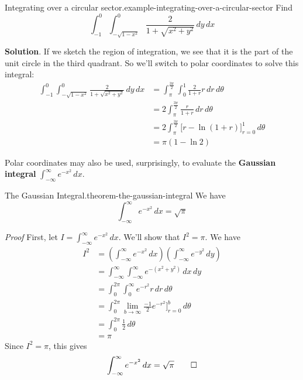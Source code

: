 \documentclass[10pt,]{book}
\makeatletter
\newcommand{\terminology}[1]{\textbf{#1}}
\renewcommand*{\proofname}{Proof}
\renewenvironment{proof}[1][\proofname]{\par
  \pushQED{\qed}%
  \normalfont \topsep6\p@\@plus6\p@\relax
  \trivlist
  \item\relax
    {\itshape
    #1\@addpunct{.}}\hspace\labelsep\ignorespaces
}{%
  \popQED\endtrivlist\@endpefalse
}
\numberwithin{equation}{section}
\makeatother
\begin{document}
\begin{example}{Integrating over a circular sector.}{example-integrating-over-a-circular-sector}%
\hypertarget{p-1488}{}%
Find%
\begin{equation*}
\int_{-1}^{0}\int_{-\sqrt{1-x^{2}}}^{0}\frac{2}{1+\sqrt{x^{2} + y^{2}}}\,dy\,dx
\end{equation*}
%
\par\smallskip%
\noindent\textbf{Solution}.\hypertarget{solution-244}{}\quad%
\hypertarget{p-1489}{}%
If we sketch the region of integration, we see that it is the part of the unit circle in the third quadrant. So we'll switch to polar coordinates to solve this integral:%
\begin{align*}
\int_{-1}^{0}\int_{-\sqrt{1-x^{2}}}^{0}\frac{2}{1+\sqrt{x^{2} + y^{2}}}\,dy\,dx & = \int_{\pi}^{\frac{3\pi}{2}}\int_{0}^{1}\frac{2}{1+r}r\,dr\,d\theta \\
& = 2\int_{\pi}^{\frac{3\pi}{2}} \frac{r}{1+r}\,dr\,d\theta \\
& = 2\int_{\pi}^{\frac{3\pi}{2}} \bigg[r - \ln(1+r)\bigg]_{r=0}^{1}\,d\theta \\
& = \pi(1-\ln2) 
\end{align*}
%
\end{example}
\hypertarget{p-1490}{}%
Polar coordinates may also be used, surprisingly, to evaluate the \terminology{Gaussian integral} \(\int_{-\infty}^{\infty}e^{-x^{2}}\,dx\).%
\begin{theorem}{The Gaussian Integral.}{}{theorem-the-gaussian-integral}%
\hypertarget{p-1491}{}%
We have%
\begin{equation*}
\int_{-\infty}^{\infty}e^{-x^{2}}\,dx = \sqrt{\pi}
\end{equation*}
%
\end{theorem}
\begin{proof}\hypertarget{proof-17}{}
\hypertarget{p-1492}{}%
First, let \(I = \int_{-\infty}^{\infty}e^{-x^{2}}\,dx\). We'll show that \(I^{2} = \pi\). We have%
\begin{align*}
I^{2} & = \left(\int_{-\infty}^{\infty}e^{-x^{2}}\,dx\right)\left(\int_{-\infty}^{\infty}e^{-y^{2}}\,dy\right) \\
& = \int_{-\infty}^{\infty}\int_{-\infty}^{\infty}e^{-(x^{2} + y^{2})}\,dx\,dy \\
& = \int_{0}^{2\pi}\int_{0}^{\infty}e^{-r^{2}}r\,dr\,d\theta \\
& = \int_{0}^{2\pi} \lim_{b\to\infty}\frac{-1}{2}e^{-r^{2}}\bigg]_{r=0}^{b}\,d\theta \\
& = \int_{0}^{2\pi} \frac{1}{2}\,d\theta \\
& = \pi 
\end{align*}
Since \(I^{2} = \pi\), this gives%
\begin{equation*}
\int_{-\infty}^{\infty}e^{-x^{2}}\,dx = \sqrt{\pi}\qedhere
\end{equation*}
%
\end{proof}
\end{document}

